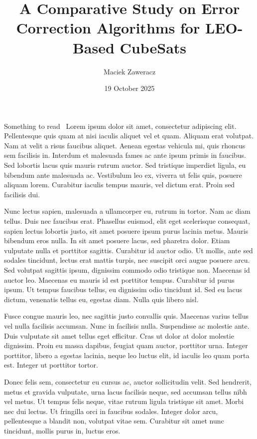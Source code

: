 \documentclass{UoYCSproject}
\author{Maciek Zaweracz}
\title{A Comparative Study on Error Correction Algorithms for LEO-Based CubeSats}
\date{19 October 2025}
\begin{document}
\maketitle
\listoffigures
\listoftables

\begin{summary}
Something to read~\cite{zobel2015writing} Lorem ipsum dolor sit amet, consectetur adipiscing elit. Pellentesque quis quam at nisi iaculis aliquet vel et quam. Aliquam erat volutpat. Nam at velit a risus faucibus aliquet. Aenean egestas vehicula mi, quis rhoncus sem facilisis in. Interdum et malesuada fames ac ante ipsum primis in faucibus. Sed lobortis lacus quis mauris rutrum auctor. Sed tristique imperdiet ligula, eu bibendum ante malesuada ac. Vestibulum leo ex, viverra ut felis quis, posuere aliquam lorem. Curabitur iaculis tempus mauris, vel dictum erat. Proin sed facilisis dui.

Nunc lectus sapien, malesuada a ullamcorper eu, rutrum in tortor. Nam ac diam tellus. Duis nec faucibus erat. Phasellus euismod, elit eget scelerisque consequat, sapien lectus lobortis justo, sit amet posuere ipsum purus lacinia metus. Mauris bibendum eros nulla. In sit amet posuere lacus, sed pharetra dolor. Etiam vulputate nulla et porttitor sagittis. Curabitur id auctor odio. Ut mollis, ante sed sodales tincidunt, lectus erat mattis turpis, nec suscipit orci augue posuere arcu. Sed volutpat sagittis ipsum, dignissim commodo odio tristique non. Maecenas id auctor leo. Maecenas eu mauris id est porttitor tempus. Curabitur id purus ipsum. Ut tempus faucibus tellus, eu dignissim odio tincidunt id. Sed eu lacus dictum, venenatis tellus eu, egestas diam. Nulla quis libero nisl.

Fusce congue mauris leo, nec sagittis justo convallis quis. Maecenas varius tellus vel nulla facilisis accumsan. Nunc in facilisis nulla. Suspendisse ac molestie ante. Duis vulputate sit amet tellus eget efficitur. Cras ut dolor at dolor molestie dignissim. Proin eu massa dapibus, feugiat quam auctor, porttitor urna. Integer porttitor, libero a egestas lacinia, neque leo luctus elit, id iaculis leo quam porta est. Integer ut porttitor tortor.

Donec felis sem, consectetur eu cursus ac, auctor sollicitudin velit. Sed hendrerit, metus et gravida vulputate, urna lacus facilisis neque, sed accumsan tellus nibh vel metus. Ut tempus felis neque, vitae rutrum ligula tristique sit amet. Morbi nec dui lectus. Ut fringilla orci in faucibus sodales. Integer dolor arcu, pellentesque a blandit non, volutpat vitae sem. Curabitur sit amet nunc tincidunt, mollis purus in, luctus eros.


\end{summary}
\end{document}
